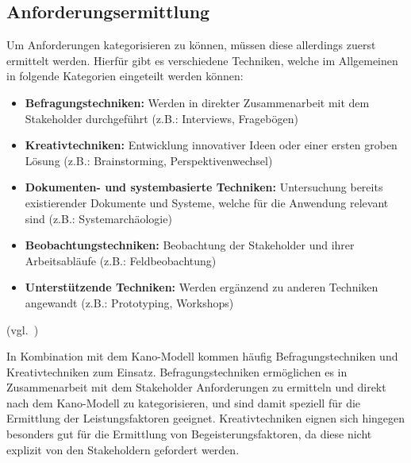 \subsection{Anforderungsermittlung}\label{subsec:anforderungsermittlung}
Um Anforderungen kategorisieren zu können, müssen diese allerdings zuerst ermittelt werden.
Hierfür gibt es verschiedene Techniken, welche im Allgemeinen in folgende Kategorien eingeteilt werden können:

\begin{itemize}
    \item \textbf{Befragungstechniken:} Werden in direkter Zusammenarbeit mit dem Stakeholder durchgeführt (z.B.: Interviews, Fragebögen)
    \item \textbf{Kreativtechniken:} Entwicklung innovativer Ideen oder einer ersten groben Lösung (z.B.: Brainstorming, Perspektivenwechsel)
    \item \textbf{Dokumenten- und systembasierte Techniken:} Untersuchung bereits existierender Dokumente und Systeme,
    welche für die Anwendung relevant sind (z.B.: Systemarchäologie)
    \item \textbf{Beobachtungstechniken:} Beobachtung der Stakeholder und ihrer Arbeitsabläufe (z.B.: Feldbeobachtung)
    \item \textbf{Unterstützende Techniken:} Werden ergänzend zu anderen Techniken angewandt (z.B.: Prototyping, Workshops)
\end{itemize} (vgl.~\autocite{Maulhardt.b})

In Kombination mit dem Kano-Modell kommen häufig Befragungstechniken und Kreativtechniken zum Einsatz.
Befragungstechniken ermöglichen es in Zusammenarbeit mit dem Stakeholder Anforderungen zu ermitteln und direkt nach dem
Kano-Modell zu kategorisieren,
und sind damit speziell für die Ermittlung der Leistungsfaktoren geeignet.
Kreativtechniken eignen sich hingegen besonders gut für die Ermittlung von Begeisterungsfaktoren, da diese nicht explizit
von den Stakeholdern gefordert werden.
